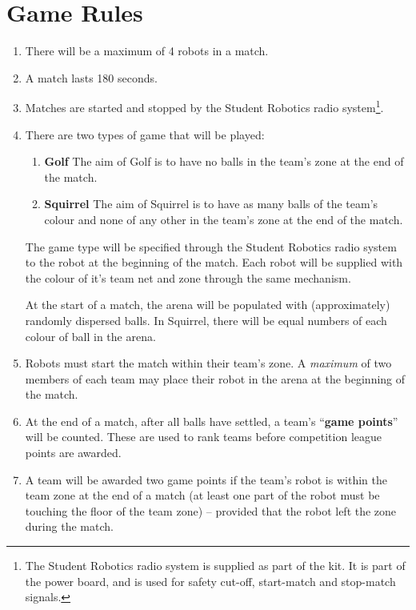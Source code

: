 \section {Game Rules}
\label{game-rules}

\begin{enumerate}
\item There will be a maximum of 4 robots in a match.
\item A match lasts 180 seconds.
\item Matches are started and stopped by the Student Robotics radio system\footnote{The Student Robotics radio system is supplied as part of the kit.  It is part of the power board, and is used for safety cut-off, start-match and stop-match signals.}.
\item There are two types of game that will be played:
  \renewcommand{\labelenumii}{\arabic{enumii}.}
  \begin{enumerate}
  \item \textbf{Golf} The aim of Golf is to have no balls in the team's zone at the end of the match.
  \item \textbf{Squirrel} The aim of Squirrel is to have as many balls of the team's colour and none of any other in the team's zone at the end of the match.
  \end{enumerate}

The game type will be specified through the Student Robotics radio system to the robot at the beginning of the match.  Each robot will be supplied with the colour of it's team net and zone through the same mechanism.

At the start of a match, the arena will be populated with (approximately) randomly dispersed balls.  In Squirrel, there will be equal numbers of each colour of ball in the arena.

\item Robots must start the match within their team's zone.  A \emph{maximum} of two members of each team may place their robot in the arena at the beginning of the match.

\item At the end of a match, after all balls have settled, a team's ``\textbf{game points}'' will be counted.  These are used to rank teams before competition league points are awarded.

\item A team will be awarded two game points if the team's robot is within the team zone at the end of a match (at least one part of the robot must be touching the floor of the team zone) -- provided that the robot left the zone during the match.


\end{enumerate}
